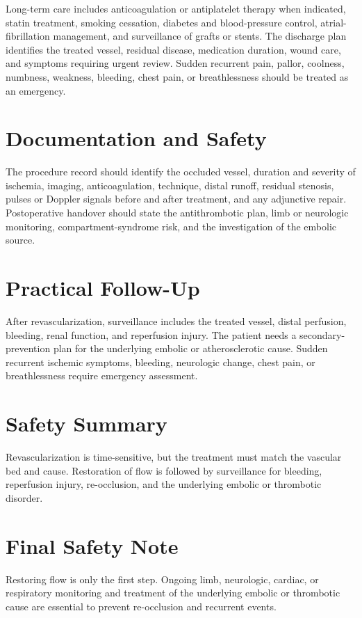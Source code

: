 Long-term care includes anticoagulation or antiplatelet therapy when indicated, statin treatment, smoking cessation, diabetes and blood-pressure control, atrial-fibrillation management, and surveillance of grafts or stents. The discharge plan identifies the treated vessel, residual disease, medication duration, wound care, and symptoms requiring urgent review. Sudden recurrent pain, pallor, coolness, numbness, weakness, bleeding, chest pain, or breathlessness should be treated as an emergency.

\section*{Documentation and Safety}
The procedure record should identify the occluded vessel, duration and severity of ischemia, imaging, anticoagulation, technique, distal runoff, residual stenosis, pulses or Doppler signals before and after treatment, and any adjunctive repair. Postoperative handover should state the antithrombotic plan, limb or neurologic monitoring, compartment-syndrome risk, and the investigation of the embolic source.

\section*{Practical Follow-Up}
After revascularization, surveillance includes the treated vessel, distal perfusion, bleeding, renal function, and reperfusion injury. The patient needs a secondary-prevention plan for the underlying embolic or atherosclerotic cause. Sudden recurrent ischemic symptoms, bleeding, neurologic change, chest pain, or breathlessness require emergency assessment.

\section*{Safety Summary}
Revascularization is time-sensitive, but the treatment must match the vascular bed and cause. Restoration of flow is followed by surveillance for bleeding, reperfusion injury, re-occlusion, and the underlying embolic or thrombotic disorder.

\section*{Final Safety Note}
Restoring flow is only the first step. Ongoing limb, neurologic, cardiac, or respiratory monitoring and treatment of the underlying embolic or thrombotic cause are essential to prevent re-occlusion and recurrent events.

